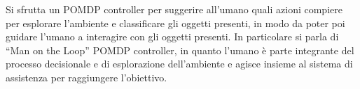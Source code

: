 Si sfrutta un POMDP controller per suggerire all'umano quali azioni compiere per esplorare l'ambiente e classificare
gli oggetti presenti, in modo da poter poi guidare l'umano a interagire con gli oggetti presenti. In particolare si parla
di ``Man on the Loop'' POMDP controller, in quanto l'umano è parte integrante del processo decisionale e di esplorazione
dell'ambiente e agisce insieme al sistema di assistenza per raggiungere l'obiettivo.
